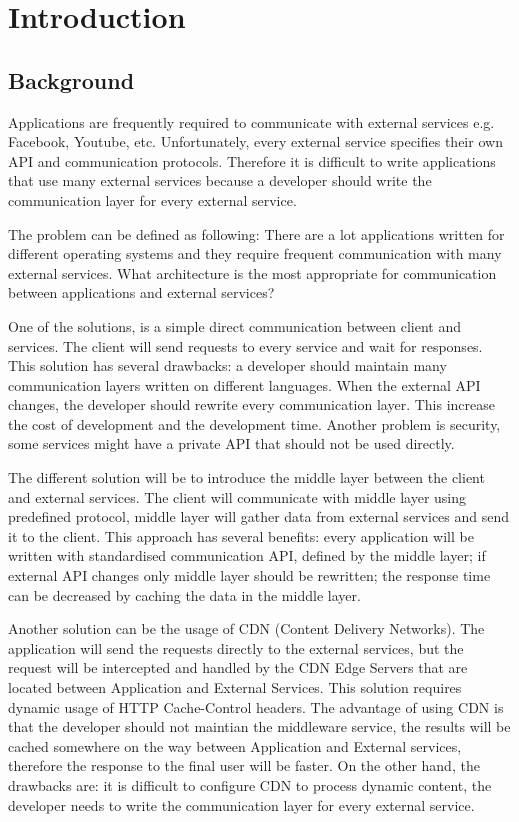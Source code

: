 \section{Introduction}

\subsection{Background}

Applications are frequently required to communicate with external services e.g. Facebook, Youtube, etc. Unfortunately, every external service specifies their own API and communication protocols. Therefore it is difficult to write applications that use many external services because a developer should write the communication layer for every external service. 

The problem can be defined as following:  There are a lot applications written for different operating systems and they require frequent communication with many external services. What architecture is the most appropriate for communication between applications and external services? 

One of the solutions, is a simple direct communication between client and services. The client will send requests to every service and wait for responses. This solution has several drawbacks: a developer should maintain many communication layers written on different languages. When the external API changes, the developer should rewrite every communication layer. This increase the cost of development and the development time. Another problem is security, some services might have a private API that should not be used directly.

The different solution will be to introduce the middle layer between the client and external services. The client will communicate with middle layer using predefined protocol, middle layer will gather data from external services and send it to the client. This approach has several benefits: every application will be written with standardised communication API, defined by the middle layer; if external API changes only middle layer should be rewritten; the response time can be decreased by caching the data in the middle layer. 

Another solution can be the usage of CDN (Content Delivery Networks). The application will send the requests directly to the external services, but the request will be intercepted and handled by the CDN Edge Servers that are located between Application and External Services. This solution requires dynamic usage of HTTP Cache-Control headers. The advantage of using CDN is that the developer should not maintian the middleware service, the results will be cached somewhere on the way between Application and External services, therefore the response to the final user will be faster. On the other hand, the drawbacks are: it is difficult to configure CDN to process dynamic content, the developer needs to write the communication layer for every external service. 

